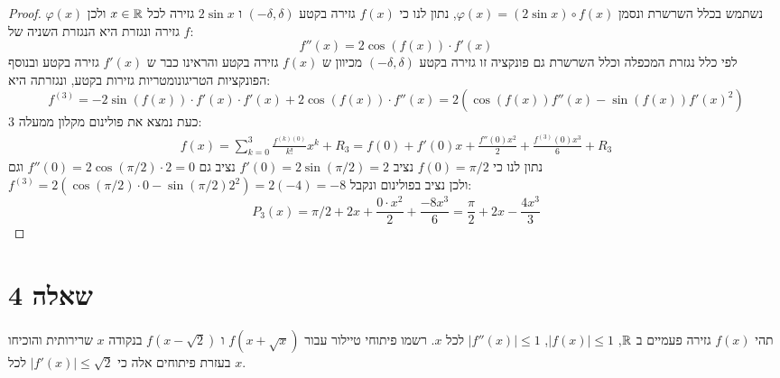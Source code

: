 \documentclass{article}
\begin{document}
	\begin{proof}
		נשתמש בכלל השרשרת ונסמן $\varphi(x) = (2\sin x) \circ f(x)$, נתון לנו כי $f(x)$ גזירה בקטע $(-\delta, \delta)$ ו $2 \sin x$ גזירה לכל $x \in \mathbb{R}$ ולכן $\varphi(x)$ גזירה ונגזרת היא הנגזרת השניה של $f$:
		\[ f''(x) = 2 \cos(f(x)) \cdot f'(x) \]
		לפי כלל נגזרת המכפלה וכלל השרשרת גם פונקציה זו גזירה בקטע $(-\delta, \delta)$
		מכיוון ש $f(x)$ גזירה בקטע והראינו כבר ש $f'(x)$ גזירה בקטע ובנוסף הפונקציות הטריגונומטריות גזירות בקטע, ונגזרתה היא:
		\[
			f^{(3)} = -2 \sin(f(x)) \cdot f'(x) \cdot f'(x) + 2 \cos(f(x)) \cdot f''(x)
			= \boxed{2(\cos(f(x)) f''(x) - \sin(f(x)) f'(x)^2)}
		 \]
		 כעת נמצא את פולינום מקלון ממעלה 3:
		 \begin{align*}
			f(x)
			= \sum^3_{k=0} \frac{f^{(k)(0)}}{k!}x^k + R_3
			= f(0) + f'(0)x + \frac{f''(0)x^2}{2} + \frac{f^{(3)}(0)x^3}{6} + R_3
		 \end{align*}
		 נתון לנו כי $f(0) = \pi/2$ נציב $f'(0) = 2\sin(\pi/2) = 2$ נציב גם $f''(0) = 2\cos(\pi/2) \cdot 2 = 0$
		 וגם \\
		 $f^{(3)} = 2(\cos(\pi/2) \cdot 0 - \sin(\pi/2) 2^2) = 2(-4) = -8$
		 ולכן נציב בפולינום ונקבל:
		 \[
		 	P_3(x) = \pi/2 + 2x + \frac{0 \cdot x^2}{2} + \frac{-8x^3}{6}
			= \boxed{\frac{\pi}{2} + 2x - \frac{4x^3}{3}}
		 \]
	\end{proof}

	\section*{שאלה 4}
	תהי $f(x)$ גזירה פעמיים ב $\mathbb{R}$, $|f(x)| \leq 1$, $|f''(x)| \leq 1$ לכל $x$.
	רשמו פיתוחי טיילור עבור $f(x+\sqrt{x})$ ו $f(x - \sqrt{2})$ בנקודה $x$ שרירותית
	והוכיחו בעזרת פיתוחים אלה כי $|f'(x)| \leq \sqrt{2}$ לכל $x$.
\end{document}
